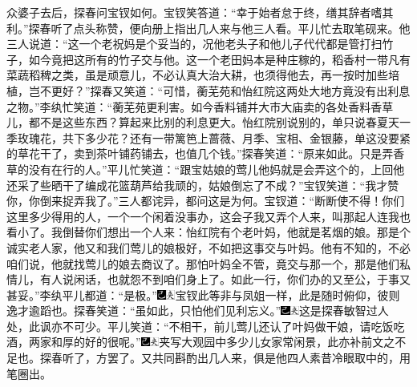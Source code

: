 众婆子去后，探春问宝钗如何。宝钗笑答道：“幸于始者怠于终，缮其辞者嗜其利。”探春听了点头称赞，便向册上指出几人来与他三人看。平儿忙去取笔砚来。他三人说道：“这一个老祝妈是个妥当的，况他老头子和他儿子代代都是管打扫竹子，如今竟把这所有的竹子交与他。这一个老田妈本是种庄稼的，稻香村一带凡有菜蔬稻稗之类，虽是顽意儿，不必认真大治大耕，也须得他去，再一按时加些培植，岂不更好？”探春又笑道：“可惜，蘅芜苑和怡红院这两处大地方竟没有出利息之物。”李纨忙笑道：“蘅芜苑更利害。如今香料铺并大市大庙卖的各处香料香草儿，都不是这些东西？算起来比别的利息更大。怡红院别说别的，单只说春夏天一季玫瑰花，共下多少花？还有一带篱笆上蔷薇、月季、宝相、金银藤，单这没要紧的草花干了，卖到茶叶铺药铺去，也值几个钱。”探春笑道：“原来如此。只是弄香草的没有在行的人。”平儿忙笑道：“跟宝姑娘的莺儿他妈就是会弄这个的，上回他还采了些晒干了编成花篮葫芦给我顽的，姑娘倒忘了不成？”宝钗笑道：“我才赞你，你倒来捉弄我了。”三人都诧异，都问这是为何。宝钗道：“断断使不得！你们这里多少得用的人，一个一个闲着没事办，这会子我又弄个人来，叫那起人连我也看小了。我倒替你们想出一个人来：怡红院有个老叶妈，他就是茗烟的娘。那是个诚实老人家，他又和我们莺儿的娘极好，不如把这事交与叶妈。他有不知的，不必咱们说，他就找莺儿的娘去商议了。那怕叶妈全不管，竟交与那一个，那是他们私情儿，有人说闲话，也就怨不到咱们身上了。如此一行，你们办的又至公，于事又甚妥。”李纨平儿都道：“是极。”{\includegraphics[width=3mm]{../Images/00003}\includegraphics[width=3mm]{../Images/00012}\footnotesize \kaishu 宝钗此等非与凤姐一样，此是随时俯仰，彼则逸才逾蹈也。}探春笑道：“虽如此，只怕他们见利忘义。”{\includegraphics[width=3mm]{../Images/00003}\includegraphics[width=3mm]{../Images/00012}\footnotesize \kaishu 这是探春敏智过人处，此讽亦不可少。}平儿笑道：“不相干，前儿莺儿还认了叶妈做干娘，请吃饭吃酒，两家和厚的好的很呢。”{\includegraphics[width=3mm]{../Images/00003}\includegraphics[width=3mm]{../Images/00012}\footnotesize \kaishu 夹写大观园中多少儿女家常闲景，此亦补前文之不足也。}探春听了，方罢了。又共同斟酌出几人来，俱是他四人素昔冷眼取中的，用笔圈出。


